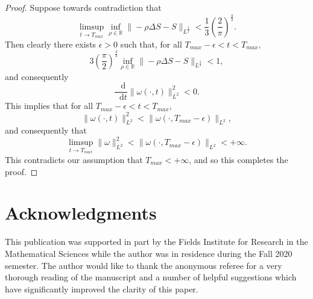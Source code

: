 \documentclass[11pt]{article}
\theoremstyle{plain}
\theoremstyle{remark}
\numberwithin{equation}{section}
\newcommand{\diff}{\mathop{}\!\mathrm{d}}
\begin{document}
\begin{proof}
Suppose towards contradiction that 
\begin{equation}
    \limsup_{t\to T_{max}} 
    \inf_{\rho\in\mathbb{R}}
    \|-\rho\Delta S-S\|_{L^\frac{3}{2}}
    <
    \frac{1}{3}
    \left(\frac{2}{\pi}\right)^\frac{4}{3}.
\end{equation}
Then clearly there exists $\epsilon>0$ such that,
for all $T_{max}-\epsilon<t<T_{max},$
\begin{equation}
3\left(\frac{\pi}{2}\right)^\frac{4}{3}
    \inf_{\rho\in\mathbb{R}}
    \|-\rho\Delta S-S\|_{L^\frac{3}{2}}
    <
    1,
\end{equation}
and consequently
\begin{equation}
    \frac{\diff}{\diff t}
    \|\omega(\cdot,t)\|_{L^2}^2<0.
\end{equation}
This implies that for all $T_{max}-\epsilon<t<T_{max}$,
\begin{equation}
    \|\omega(\cdot,t)\|_{L^2}^2
    <
    \|\omega(\cdot,T_{max}-\epsilon)\|_{L^2},
\end{equation}
and consequently that
\begin{equation}
    \limsup_{t\to T_{max}}\|\omega\|_{L^2}^2
    <
    \|\omega(\cdot,T_{max}-\epsilon)\|_{L^2}<+\infty.
\end{equation}
This contradicts our assumption that $T_{max}<+\infty$,
and so this completes the proof.
\end{proof}



\section*{Acknowledgments}
This publication was supported in part by the Fields Institute for Research in the Mathematical Sciences while the author was in residence during the Fall 2020 semester.
The author would like to thank the anonymous referee for a very thorough reading of the manuscript and a number of helpful suggestions which have significantly improved the clarity of this paper.








\end{document}
